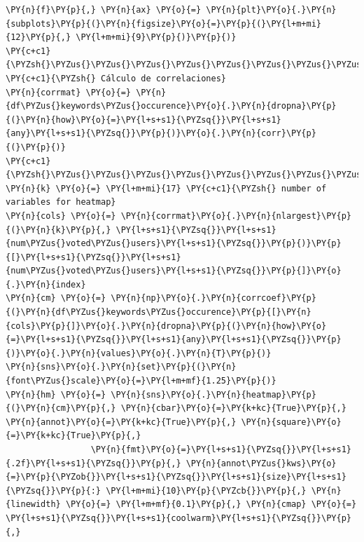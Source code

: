     \begin{tcolorbox}[breakable, size=fbox, boxrule=1pt, pad at break*=1mm,colback=cellbackground, colframe=cellborder]
\begin{Verbatim}[commandchars=\\\{\}]
\PY{n}{f}\PY{p}{,} \PY{n}{ax} \PY{o}{=} \PY{n}{plt}\PY{o}{.}\PY{n}{subplots}\PY{p}{(}\PY{n}{figsize}\PY{o}{=}\PY{p}{(}\PY{l+m+mi}{12}\PY{p}{,} \PY{l+m+mi}{9}\PY{p}{)}\PY{p}{)}
\PY{c+c1}{\PYZsh{}\PYZus{}\PYZus{}\PYZus{}\PYZus{}\PYZus{}\PYZus{}\PYZus{}\PYZus{}\PYZus{}\PYZus{}\PYZus{}\PYZus{}\PYZus{}\PYZus{}\PYZus{}\PYZus{}\PYZus{}\PYZus{}\PYZus{}\PYZus{}\PYZus{}\PYZus{}\PYZus{}\PYZus{}\PYZus{}\PYZus{}\PYZus{}\PYZus{}\PYZus{}}
\PY{c+c1}{\PYZsh{} Cálculo de correlaciones}
\PY{n}{corrmat} \PY{o}{=} \PY{n}{df\PYZus{}keywords\PYZus{}occurence}\PY{o}{.}\PY{n}{dropna}\PY{p}{(}\PY{n}{how}\PY{o}{=}\PY{l+s+s1}{\PYZsq{}}\PY{l+s+s1}{any}\PY{l+s+s1}{\PYZsq{}}\PY{p}{)}\PY{o}{.}\PY{n}{corr}\PY{p}{(}\PY{p}{)}
\PY{c+c1}{\PYZsh{}\PYZus{}\PYZus{}\PYZus{}\PYZus{}\PYZus{}\PYZus{}\PYZus{}\PYZus{}\PYZus{}\PYZus{}\PYZus{}\PYZus{}\PYZus{}\PYZus{}\PYZus{}\PYZus{}\PYZus{}\PYZus{}\PYZus{}\PYZus{}\PYZus{}\PYZus{}\PYZus{}\PYZus{}\PYZus{}\PYZus{}\PYZus{}\PYZus{}\PYZus{}\PYZus{}\PYZus{}\PYZus{}\PYZus{}\PYZus{}\PYZus{}\PYZus{}\PYZus{}\PYZus{}\PYZus{}\PYZus{}}
\PY{n}{k} \PY{o}{=} \PY{l+m+mi}{17} \PY{c+c1}{\PYZsh{} number of variables for heatmap}
\PY{n}{cols} \PY{o}{=} \PY{n}{corrmat}\PY{o}{.}\PY{n}{nlargest}\PY{p}{(}\PY{n}{k}\PY{p}{,} \PY{l+s+s1}{\PYZsq{}}\PY{l+s+s1}{num\PYZus{}voted\PYZus{}users}\PY{l+s+s1}{\PYZsq{}}\PY{p}{)}\PY{p}{[}\PY{l+s+s1}{\PYZsq{}}\PY{l+s+s1}{num\PYZus{}voted\PYZus{}users}\PY{l+s+s1}{\PYZsq{}}\PY{p}{]}\PY{o}{.}\PY{n}{index}
\PY{n}{cm} \PY{o}{=} \PY{n}{np}\PY{o}{.}\PY{n}{corrcoef}\PY{p}{(}\PY{n}{df\PYZus{}keywords\PYZus{}occurence}\PY{p}{[}\PY{n}{cols}\PY{p}{]}\PY{o}{.}\PY{n}{dropna}\PY{p}{(}\PY{n}{how}\PY{o}{=}\PY{l+s+s1}{\PYZsq{}}\PY{l+s+s1}{any}\PY{l+s+s1}{\PYZsq{}}\PY{p}{)}\PY{o}{.}\PY{n}{values}\PY{o}{.}\PY{n}{T}\PY{p}{)}
\PY{n}{sns}\PY{o}{.}\PY{n}{set}\PY{p}{(}\PY{n}{font\PYZus{}scale}\PY{o}{=}\PY{l+m+mf}{1.25}\PY{p}{)}
\PY{n}{hm} \PY{o}{=} \PY{n}{sns}\PY{o}{.}\PY{n}{heatmap}\PY{p}{(}\PY{n}{cm}\PY{p}{,} \PY{n}{cbar}\PY{o}{=}\PY{k+kc}{True}\PY{p}{,} \PY{n}{annot}\PY{o}{=}\PY{k+kc}{True}\PY{p}{,} \PY{n}{square}\PY{o}{=}\PY{k+kc}{True}\PY{p}{,}
                 \PY{n}{fmt}\PY{o}{=}\PY{l+s+s1}{\PYZsq{}}\PY{l+s+s1}{.2f}\PY{l+s+s1}{\PYZsq{}}\PY{p}{,} \PY{n}{annot\PYZus{}kws}\PY{o}{=}\PY{p}{\PYZob{}}\PY{l+s+s1}{\PYZsq{}}\PY{l+s+s1}{size}\PY{l+s+s1}{\PYZsq{}}\PY{p}{:} \PY{l+m+mi}{10}\PY{p}{\PYZcb{}}\PY{p}{,} \PY{n}{linewidth} \PY{o}{=} \PY{l+m+mf}{0.1}\PY{p}{,} \PY{n}{cmap} \PY{o}{=} \PY{l+s+s1}{\PYZsq{}}\PY{l+s+s1}{coolwarm}\PY{l+s+s1}{\PYZsq{}}\PY{p}{,}

\end{Verbatim}
\end{tcolorbox}
